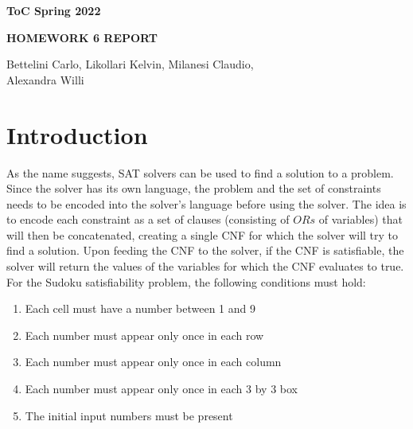 \documentclass[12pt,a4paper]{article}
\begin{document}
\begin{center}

  \bigskip \bigskip

  {\large \textbf{ToC Spring 2022}}

   \bigskip


   {\large \textbf{HOMEWORK 6 REPORT}}







  \bigskip \bigskip


  {\large Bettelini Carlo, Likollari Kelvin, Milanesi Claudio, \\
  Alexandra Willi
  }

   \bigskip

  \bigskip \bigskip



  \bigskip \bigskip

\end{center}

\section*{Introduction}

As the name suggests, SAT solvers can be used to find a solution to a problem. Since the solver has its own language, the problem and the set of constraints needs to be encoded into the solver's language before using the solver.
The idea is to encode each constraint as a set of clauses (consisting of $ORs$ of variables) that will then be concatenated, creating a single CNF for which the solver will try to find a solution.
Upon feeding the CNF to the solver, if the CNF is satisfiable, the solver will return the values of the variables for which the CNF evaluates to true.
For the Sudoku satisfiability problem, the following conditions must hold:
\begin{enumerate}
  \item Each cell must have a number  between 1 and 9
  \item Each number must appear only once in each row
  \item Each number must appear only once in each column
  \item Each number must appear only once in each 3 by 3 box
  \item The initial input numbers must be present
\end{enumerate}
\end{document}
